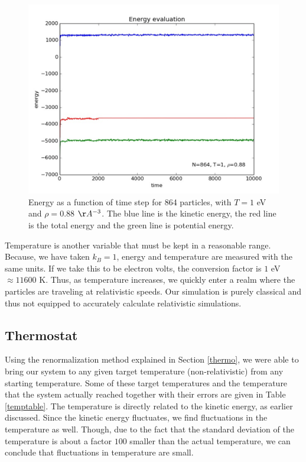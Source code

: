 \documentclass{article}
\begin{document}
\begin{multicols}{2}
\begin{figure}[H]
\begin{center}
\includegraphics[width=\linewidth]{plots/energyT1rho088N864lpnum1000.pdf}
\caption{Energy as a function of time step for 864 particles, with $T=1$ eV and $\rho = 0.88$ $\AA ^{-3}$.  The blue line is the kinetic energy, the red line is the total energy and the green line is potential energy.}
\label{engcons}
\end{center}
\end{figure}

Temperature is another variable that must be kept in a reasonable range.  Because, we have taken $k_B =1$, energy and temperature are measured with the same units.  If we take this to be electron volts, the conversion factor is $1 $ eV $\approx 11600$ K.  Thus, as temperature increases, we quickly enter a realm where the particles are traveling at relativistic speeds.  Our simulation is purely classical and thus not equipped to accurately calculate relativistic simulations.

\subsection{Thermostat}

Using the renormalization method explained in Section \ref{thermo}, we were able to bring our system to any given target temperature (non-relativistic) from any starting temperature.  Some of these target temperatures and the temperature that the system actually reached together with their errors are given in Table \ref{temptable}. The temperature is directly related to the kinetic energy, as earlier discussed. Since the kinetic energy fluctuates, we find fluctuations in the temperature as well. Though, due to the fact that the standard deviation of the temperature is about a factor $100$ smaller than the actual temperature, we can conclude that fluctuations in temperature are small. \\


\end{multicols}
\end{document}
